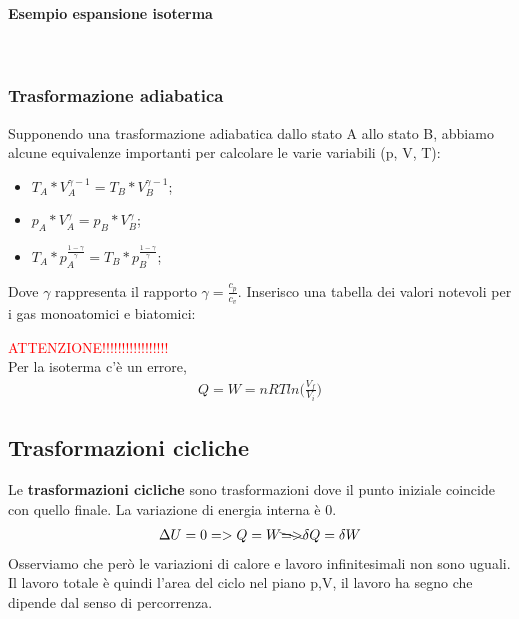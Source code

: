                 \paragraph{Esempio espansione isoterma}
                \quad\\

            \subsubsection{Trasformazione adiabatica}
                Supponendo una trasformazione adiabatica dallo stato A allo stato B, abbiamo alcune equivalenze importanti per calcolare le varie variabili (p, V, T):
                \begin{itemize}
                    \item $T_A*V_A^{\gamma-1}=T_B*V_B^{\gamma-1}$;
                    \item $p_A*V_A^{\gamma}=p_B*V_B^{\gamma}$;
                    \item $T_A*p_A^{\frac{1-\gamma}{\gamma}}=T_B*p_B^{\frac{1-\gamma}{\gamma}}$;
                \end{itemize}
                Dove $\gamma$ rappresenta il rapporto $\gamma = \frac{c_p}{c_v}$. Inserisco una tabella dei valori notevoli per i gas monoatomici e biatomici:

                \textcolor{Red}{ATTENZIONE!!!!!!!!!!!!!!!!!}\\
                Per la isoterma c'è un errore,
                \begin{align*}
                    Q = W = nRTln\bigg(\frac{V_f}{V_i}\bigg)
                \end{align*}

        \subsection{Trasformazioni cicliche}
            Le \textbf{trasformazioni cicliche} sono trasformazioni dove il punto iniziale coincide con quello finale. La variazione di energia interna è 0.
            \begin{align*}
                \Delta U = 0 => Q = W \bcancel{=>}\delta Q = \delta W
            \end{align*}
            Osserviamo che però le variazioni di calore e lavoro infinitesimali non sono uguali.\\
            Il lavoro totale è quindi l'area del ciclo nel piano p,V, il lavoro ha segno che dipende dal senso di percorrenza.

